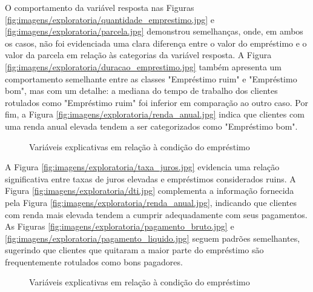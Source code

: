 O comportamento da variável resposta nas Figuras \ref{fig:imagens/exploratoria/quantidade_emprestimo.jpg} 
e \ref{fig:imagens/exploratoria/parcela.jpg} demonstrou semelhanças, onde, em ambos os casos,
não foi evidenciada uma clara diferença entre o valor do empréstimo e o valor da parcela em relação às
categorias da variável resposta. A Figura \ref{fig:imagens/exploratoria/duracao_emprestimo.jpg} 
também apresenta um comportamento semelhante entre as classes
"Empréstimo ruim" e "Empréstimo bom", mas com um detalhe: a mediana do tempo de trabalho dos clientes rotulados 
como "Empréstimo ruim" foi inferior em comparação ao outro caso. Por fim, a Figura \ref{fig:imagens/exploratoria/renda_anual.jpg} 
indica que clientes 
com uma renda anual elevada tendem a ser categorizados como "Empréstimo bom".


\begin{figure}[H]
  \centering
  \vspace{.5cm}
  \vspace{.5cm}
 \caption{Variáveis explicativas em relação à condição do empréstimo}
  
 \label{fig:exp_boxplot2}
\end{figure}

A Figura \ref{fig:imagens/exploratoria/taxa_juros.jpg} evidencia uma relação significativa entre taxas de juros elevadas e empréstimos 
considerados ruins. A Figura \ref{fig:imagens/exploratoria/dti.jpg} complementa a informação fornecida pela 
Figura \ref{fig:imagens/exploratoria/renda_anual.jpg},
indicando que clientes com renda mais elevada tendem a cumprir adequadamente com seus pagamentos.
As Figuras \ref{fig:imagens/exploratoria/pagamento_bruto.jpg} e  \ref{fig:imagens/exploratoria/pagamento_liquido.jpg} 
seguem padrões semelhantes, sugerindo que clientes que quitaram a 
maior parte do empréstimo são frequentemente rotulados como bons pagadores.

\begin{figure}[H]
    \centering
    \vspace{.5cm}
    \vspace{.5cm}
    
    \label{fig:exp_bar1}
    \caption{Variáveis explicativas em relação à condição do empréstimo}
\end{figure}



